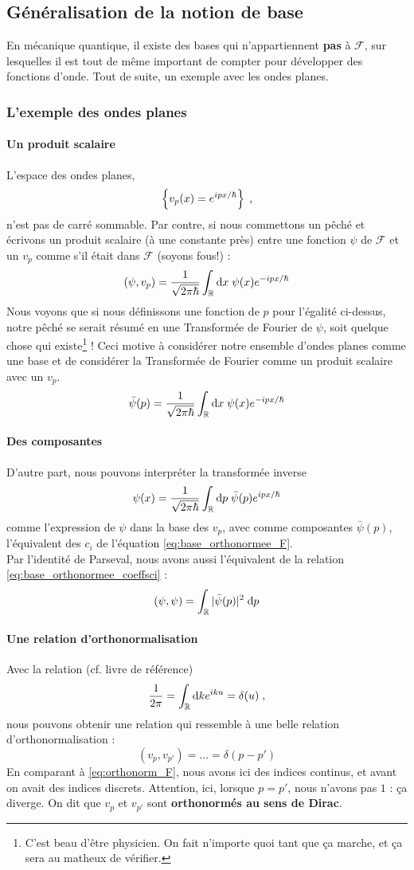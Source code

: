 \documentclass[../notesdecours.tex]{subfiles}
\begin{document}
\subsection{Généralisation de la notion de base}
En mécanique quantique, il existe des bases qui n'appartiennent \textbf{pas} à $\mathcal F$, sur lesquelles il est tout de même important de compter pour développer des fonctions d'onde. Tout de suite, un exemple avec les ondes planes.
\subsubsection{L'exemple des ondes planes}
\paragraph{Un produit scalaire}
L'espace des ondes planes,
$$\left\{ v_p(x) = e^{ipx/\hbar}\right\}\; ,$$
n'est pas de carré sommable. Par contre, si nous commettons un pêché et écrivons un produit scalaire (à une constante près) entre une fonction $\psi$ de $\mathcal F$ et un $v_p$ comme s'il était dans $\mathcal F$ (soyons fous!) :
$$(\psi, v_p) = \dfrac{1}{\sqrt{2\pi\hbar}} \int_{\mathbb R}\mathrm{d} x \; \psi(x) e^{-ipx/\hbar}$$
Nous voyons que si nous définissons une fonction de $p$ pour l'égalité ci-dessus, notre pêché se serait résumé en une Transformée de Fourier de $\psi$, soit quelque chose qui existe\footnote{C'est beau d'être physicien. On fait n'importe quoi tant que ça marche, et ça sera au matheux de vérifier.} ! Ceci motive à considérer notre ensemble d'ondes planes comme une base et de considérer la Transformée de Fourier comme un produit scalaire avec un $v_p$.
$$\bar{\psi}(p) = \dfrac{1}{\sqrt{2\pi\hbar}} \int_{\mathbb R}\mathrm{d} x \; \psi(x) e^{-ipx/\hbar}$$
\paragraph{Des composantes}
D'autre part, nous pouvons interpréter la transformée inverse
$$\psi(x) = \dfrac{1}{\sqrt{2\pi\hbar}} \int_{\mathbb R}\mathrm{d} p \; \bar\psi(p) e^{ipx/\hbar}$$
comme l'expression de $\psi$ dans la base des $v_p$, avec comme composantes $\bar \psi(p)$, l'équivalent des $c_i$ de l'équation \eqref{eq:base_orthonormee_F}. \\

Par l'identité de Parseval, nous avons aussi l'équivalent de la relation \eqref{eq:base_orthonormee_coeffsci} :
$$(\psi, \psi) = \int_{\mathbb R} |\bar \psi(p)|^2 \; \mathrm{d} p$$
\paragraph{Une relation d'orthonormalisation}
Avec la relation (cf. livre de référence) 
$$\dfrac{1}{2\pi} = \int_{\mathbb R} \mathrm{d} k e^{iku} = \delta(u) \; ,$$
nous pouvons obtenir une relation qui ressemble à une belle relation d'orthonormalisation :
$$(v_p, v_{p'}) = ... = \delta(p-p')$$
En comparant à \eqref{eq:orthonorm_F}, nous avons ici des indices continus, et avant on avait des indices discrets. Attention, ici, lorsque $p = p'$, nous n'avons pas $1$ : ça diverge. On dit que $v_p$ et $v_{p'}$ sont \textbf{orthonormés au sens de Dirac}. \\
\end{document}
